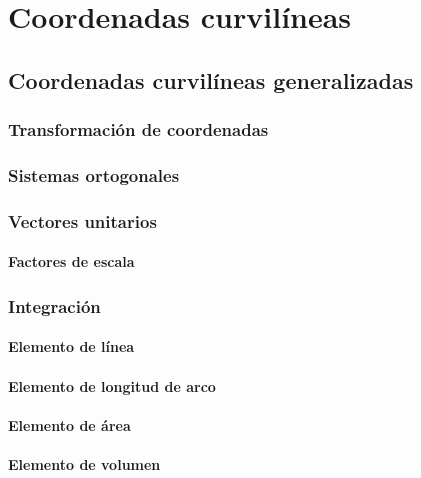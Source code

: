 \documentclass[12pt, fleqn]{report}                             %
\begin{document}
\part{Coordenadas curvilíneas}

    \chapter{Coordenadas curvilíneas generalizadas}
    
        \section{Transformación de coordenadas}
        
        \section{Sistemas ortogonales}
        
        \section{Vectores unitarios}
        
            \subsection{Factores de escala}
        
        \section{Integración}
        
            \subsection{Elemento de línea}
            
            \subsection{Elemento de longitud de arco}
            
            \subsection{Elemento de área}
            
            \subsection{Elemento de volumen}
            
\end{document}
